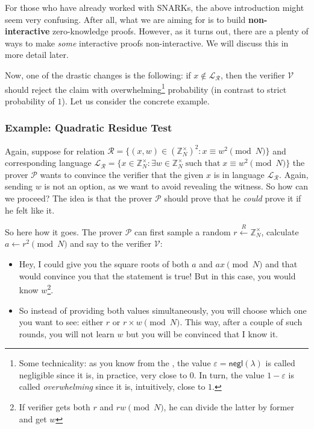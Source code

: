 \documentclass[../lecture-notes-148x210.tex]{subfiles}
\begin{document}
\begin{remark}
    For those who have already worked with SNARKs, the above introduction might seem very confusing. After all, what we are aiming for is to build \textbf{non-interactive} zero-knowledge proofs. However, as it turns out, there are a plenty of ways to make \textit{some} interactive proofs non-interactive. We will discuss this in more detail later.
\end{remark}

Now, one of the drastic changes is the following: if $x \not\in
\mathcal{L}_{\mathcal{R}}$, then the verifier $\mathcal{V}$ should reject the
claim with overwhelming\footnote{Some technicality: as you know from the
, the value $\varepsilon =
\mathsf{negl}(\lambda)$ is called negligible since it is, in practice, very
close to $0$. In turn, the value $1-\varepsilon$ is called \textit{overwhelming}
since it is, intuitively, close to $1$.} probability (in contrast to strict
probability of $1$). Let us consider the concrete example.

\subsubsection{Example: Quadratic Residue Test}\label{section:quadratic_residue_test}

Again, suppose for relation $\mathcal{R} = \{(x,w) \in (\mathbb{Z}_N^{\times})^2: x \equiv w^2 \pmod{N}\}$ and corresponding language $\mathcal{L}_{\mathcal{R}} = \{x \in \mathbb{Z}_N^{\times}: \exists w \in \mathbb{Z}_N^{\times} \; \text{such that} \; x \equiv w^2 \pmod{N}\}$ the prover $\mathcal{P}$ wants to convince the verifier that the given $x$ is in language $\mathcal{L}_{\mathcal{R}}$. Again, sending $w$ is not an option, as we want to avoid revealing the witness. So how can we proceed? The idea is that the prover $\mathcal{P}$ should prove that he \textit{could} prove it if he felt like it. 

So here how it goes. The prover $\mathcal{P}$ can first sample a random $r \xleftarrow{R} \mathbb{Z}_N^{\times}$, calculate $a \gets r^2 \pmod{N}$ and say to the verifier $\mathcal{V}$: 
\begin{itemize}
    \item Hey, I could give you the square roots of both $a$ and $ax \pmod{N}$ and that would convince you that the statement is true! But in this case, you would know $w$\footnote{If verifier gets both $r$ and $rw \pmod{N}$, he can divide the latter by former and get $w$}.
    \item So instead of providing both values simultaneously, you will choose which one you want to see: either $r$ or $r\times w\pmod{N}$. This way, after a couple of such rounds, you will not learn $w$ but you will be convinced that I know it.
\end{itemize}
\end{document}
